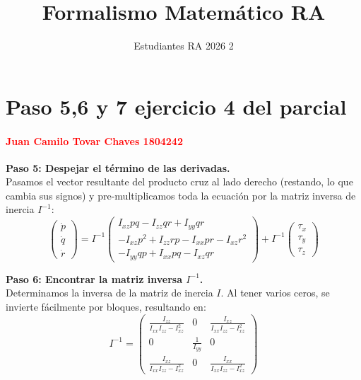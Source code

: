\documentclass[11pt,a4paper]{article}
\title{Formalismo Matemático RA}
\author{Estudiantes RA 2026 2 }
\date{}
\begin{document}
\maketitle


\section{Paso 5,6 y 7 ejercicio 4 del parcial}

\paragraph{\textcolor{red}  {Juan Camilo Tovar Chaves 1804242}}


\textbf{Paso 5: Despejar el término de las derivadas.} \\
Pasamos el vector resultante del producto cruz al lado derecho (restando, lo que cambia sus signos) y pre-multiplicamos toda la ecuación por la matriz inversa de inercia $I^{-1}$:
\begin{equation*}
    \begin{pmatrix} \dot{p} \\ \dot{q} \\ \dot{r} \end{pmatrix} =
    I^{-1} \begin{pmatrix}
    I_{xz}pq - I_{zz}qr + I_{yy}qr \\
    -I_{xz}p^2 + I_{zz}rp - I_{xx}pr - I_{xz}r^2 \\
    -I_{yy}qp + I_{xx}pq - I_{xz}qr
    \end{pmatrix} + I^{-1} \begin{pmatrix} \tau_x \\ \tau_y \\ \tau_z \end{pmatrix}
\end{equation*}

\vspace{0.3cm}
\textbf{Paso 6: Encontrar la matriz inversa $I^{-1}$.} \\
Determinamos la inversa de la matriz de inercia $I$. Al tener varios ceros, se invierte fácilmente por bloques, resultando en:
\begin{equation*}
    I^{-1} = \begin{pmatrix}
    \frac{I_{zz}}{I_{xx}I_{zz} - I_{xz}^2} & 0 & \frac{I_{xz}}{I_{xx}I_{zz} - I_{xz}^2} \\[10pt]
    0 & \frac{1}{I_{yy}} & 0 \\[10pt]
    \frac{I_{xz}}{I_{xx}I_{zz} - I_{xz}^2} & 0 & \frac{I_{xx}}{I_{xx}I_{zz} - I_{xz}^2}
    \end{pmatrix}
\end{equation*}
\end{document}
